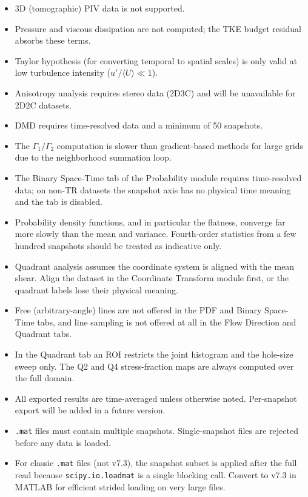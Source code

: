 \begin{itemize}[leftmargin=1.5em]
  \item 3D (tomographic) PIV data is not supported.
  \item Pressure and viscous dissipation are not computed; the TKE budget residual absorbs these terms.
  \item Taylor hypothesis (for converting temporal to spatial scales) is only valid at low turbulence intensity ($u'/\langle U\rangle \ll 1$).
  \item Anisotropy analysis requires stereo data (2D3C) and will be unavailable for 2D2C datasets.
  \item DMD requires time-resolved data and a minimum of 50 snapshots.
  \item The $\Gamma_1/\Gamma_2$ computation is slower than gradient-based methods for large grids due to the neighborhood summation loop.
  \item The Binary Space-Time tab of the Probability module requires time-resolved data; on non-TR datasets the snapshot axis has no physical time meaning and the tab is disabled.
  \item Probability density functions, and in particular the flatness, converge far more slowly than the mean and variance. Fourth-order statistics from a few hundred snapshots should be treated as indicative only.
  \item Quadrant analysis assumes the coordinate system is aligned with the mean shear. Align the dataset in the Coordinate Transform module first, or the quadrant labels lose their physical meaning.
  \item Free (arbitrary-angle) lines are not offered in the PDF and Binary Space-Time tabs, and line sampling is not offered at all in the Flow Direction and Quadrant tabs.
  \item In the Quadrant tab an ROI restricts the joint histogram and the hole-size sweep only. The Q2 and Q4 stress-fraction maps are always computed over the full domain.
  \item All exported results are time-averaged unless otherwise noted. Per-snapshot export will be added in a future version.
  \item \texttt{.mat} files must contain multiple snapshots. Single-snapshot files are rejected before any data is loaded.
  \item For classic \texttt{.mat} files (not v7.3), the snapshot subset is applied after the full read because \texttt{scipy.io.loadmat} is a single blocking call. Convert to v7.3 in MATLAB for efficient strided loading on very large files.
\end{itemize}


